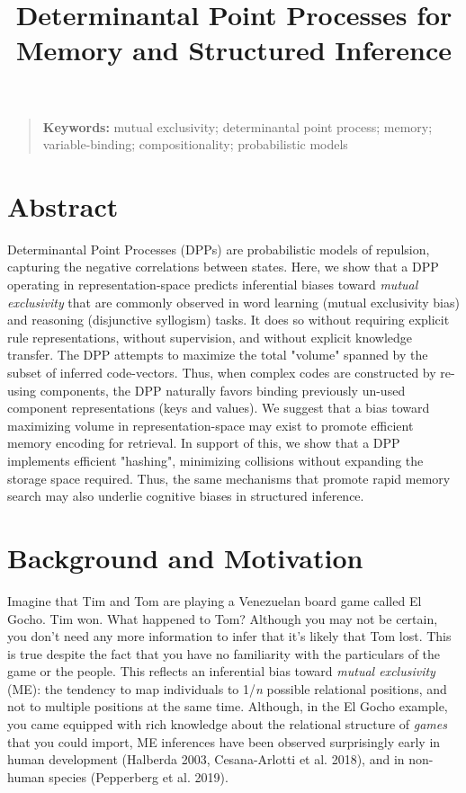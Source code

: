 \documentclass[10pt,letterpaper]{article}
\title{Determinantal Point Processes for Memory and Structured Inference}
\begin{document}
\maketitle


\begin{quote}
\small
\textbf{Keywords:} 
mutual exclusivity; determinantal point process; memory;
variable-binding; compositionality; probabilistic models
\end{quote}

\section{Abstract}


Determinantal Point Processes (DPPs) are probabilistic models of repulsion, capturing the negative correlations between states.  Here, we show that a DPP operating in representation-space predicts inferential biases toward \textit{mutual exclusivity} that are commonly observed in word learning (mutual exclusivity bias) and reasoning (disjunctive syllogism) tasks. It does so without requiring explicit rule representations, without supervision, and without explicit knowledge transfer. The DPP attempts to maximize the total "volume" spanned by the subset of inferred code-vectors. Thus, when complex codes are constructed by re-using components, the DPP naturally favors binding previously un-used component representations (keys and values). We suggest that a bias toward maximizing volume in representation-space may exist to promote efficient memory encoding for retrieval. In support of this, we show that a DPP implements efficient "hashing", minimizing collisions without expanding the storage space required. Thus, the same mechanisms that promote rapid memory search may also underlie cognitive biases in structured inference.



\section{Background and Motivation}
Imagine that Tim and Tom are playing a Venezuelan board game called El Gocho. Tim won. What happened to Tom? Although you may not be certain, you don't need any more information to infer that it's likely that Tom lost. This is true despite the fact that you have no familiarity with the particulars of the game or the people. This reflects an inferential bias toward \textit{mutual exclusivity} (ME): the tendency to map individuals to 1/\textit{n} possible relational positions, and not to multiple positions at the same time. Although, in the El Gocho example, you came equipped with rich knowledge about the relational structure of \textit{games} that you could import, ME inferences have been observed surprisingly early in human development (Halberda 2003, Cesana-Arlotti et al. 2018), and in non-human species (Pepperberg et al. 2019). 
\end{document}

